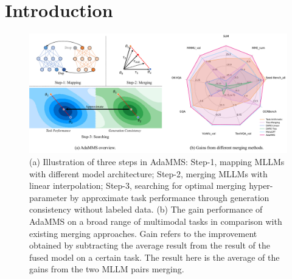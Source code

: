 \section{Introduction}
\label{sec:intro}




\begin{figure}
    \centering
    \includegraphics[width=0.9\linewidth, bb=0 0 1074 498]{figure/head.pdf}
    \caption{(a) Illustration of three steps in AdaMMS: Step-1, mapping MLLMs with different model architecture; Step-2, merging MLLMs with linear interpolation; Step-3, searching for optimal merging hyper-parameter by approximate task performance through generation consistency without labeled data. (b) The gain performance of AdaMMS on a broad range of multimodal tasks in comparison with existing merging approaches. Gain refers to the improvement obtained by subtracting the average result from the result of the fused model on a certain task. The result here is the average of the gains from the two MLLM pairs merging. }
    \label{fig:figure1}
\end{figure}

